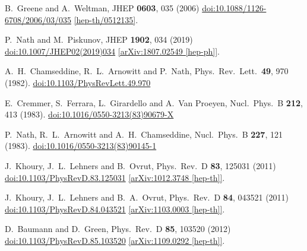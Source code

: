 \documentclass[12pt]{article}
\begin{document}
\begin{thebibliography}{99}
  B.~Greene and A.~Weltman,
  JHEP {\bf 0603}, 035 (2006)
  \href{https://dx.doi.org/10.1088/1126-6708/2006/03/035}{doi:10.1088/1126-6708/2006/03/035}
  \href{https://arxiv.org/abs/hep-th/0512135}{[hep-th/0512135]}.

  P.~Nath and M.~Piskunov,
  JHEP {\bf 1902}, 034 (2019)
  \href{https://dx.doi.org/10.1007/JHEP02(2019)034}{doi:10.1007/JHEP02(2019)034}
  \href{https://arxiv.org/abs/1807.02549}{[arXiv:1807.02549 [hep-ph]]}.

  A.~H.~Chamseddine, R.~L.~Arnowitt and P.~Nath,
  Phys.\ Rev.\ Lett.\  {\bf 49}, 970 (1982).
  \href{https://dx.doi.org/10.1103/PhysRevLett.49.970}{doi:10.1103/PhysRevLett.49.970}

  E.~Cremmer, S.~Ferrara, L.~Girardello and A.~Van Proeyen,
  Nucl.\ Phys.\ B {\bf 212}, 413 (1983).
  \href{https://dx.doi.org/10.1016/0550-3213(83)90679-X}{doi:10.1016/0550-3213(83)90679-X}

  P.~Nath, R.~L.~Arnowitt and A.~H.~Chamseddine,
  Nucl.\ Phys.\ B {\bf 227}, 121 (1983).
  \href{https://dx.doi.org/10.1016/0550-3213(83)90145-1}{doi:10.1016/0550-3213(83)90145-1}

  J.~Khoury, J.~L.~Lehners and B.~Ovrut,
  Phys.\ Rev.\ D {\bf 83}, 125031 (2011)
  \href{https://dx.doi.org/10.1103/PhysRevD.83.125031}{doi:10.1103/PhysRevD.83.125031}
  \href{https://arxiv.org/abs/1012.3748}{[arXiv:1012.3748 [hep-th]]}.

  J.~Khoury, J.~L.~Lehners and B.~A.~Ovrut,
  Phys.\ Rev.\ D {\bf 84}, 043521 (2011)
  \href{https://dx.doi.org/10.1103/PhysRevD.84.043521}{doi:10.1103/PhysRevD.84.043521}
  \href{https://arxiv.org/abs/1103.0003}{[arXiv:1103.0003 [hep-th]]}.

  D.~Baumann and D.~Green,
  Phys.\ Rev.\ D {\bf 85}, 103520 (2012)
  \href{https://dx.doi.org/10.1103/PhysRevD.85.103520}{doi:10.1103/PhysRevD.85.103520}
  \href{https://arxiv.org/abs/1109.0292}{[arXiv:1109.0292 [hep-th]]}.


\end{thebibliography}
\end{document}
